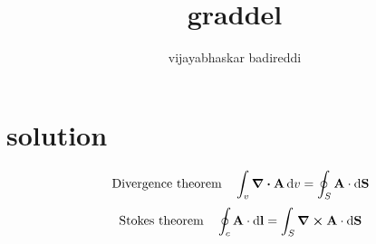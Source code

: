 \documentclass[12pt]{article}
\title{graddel}
\author{vijayabhaskar badireddi}
\begin{document}

\section*{solution}
\[\qq{Divergence theorem}\int_{v}\div{\vb{A}\dd{v}}=\oint_{S}\vb{A}\cdot\dd{\vb{S}}\]
\[\qq{Stokes theorem}\oint_c\vb{A}\cdot\dd{\vb{l}}=\int_S\curl{\vb{A}}\cdot\dd{\vb{S}}\]
\end{document}
